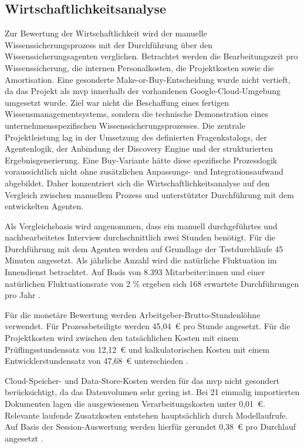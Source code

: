 \documentclass[
  10pt,
  ngerman,
  a4paper,
  toc=graduated,
  numbers=noenddot,
  headings=standardclasses,
  nonumberlist
]{scrartcl}
\begin{document}
\subsection{Wirtschaftlichkeitsanalyse}
\label{wirtschaftlichkeitsanalyse}
Zur Bewertung der Wirtschaftlichkeit wird der manuelle Wissenssicherungsprozess mit der Durchführung über den Wissenssicherungsagenten verglichen. Betrachtet werden die Bearbeitungszeit pro Wissenssicherung, die internen Personalkosten, die Projektkosten sowie die Amortisation. Eine gesonderte Make-or-Buy-Entscheidung wurde nicht vertieft, da das Projekt als \gls{mvp} innerhalb der vorhandenen Google-Cloud-Umgebung umgesetzt wurde. Ziel war nicht die Beschaffung eines fertigen Wissensmanagementsystems, sondern die technische Demonstration eines unternehmensspezifischen Wissenssicherungsprozesses. Die zentrale Projektleistung lag in der Umsetzung des definierten Fragenkatalogs, der Agentenlogik, der Anbindung der Discovery Engine und der strukturierten Ergebnisgenerierung. Eine Buy-Variante hätte diese spezifische Prozesslogik voraussichtlich nicht ohne zusätzlichen Anpassungs- und Integrationsaufwand abgebildet. Daher konzentriert sich die Wirtschaftlichkeitsanalyse auf den Vergleich zwischen manuellem Prozess und unterstützter Durchführung mit dem entwickelten Agenten.

Als Vergleichsbasis wird angenommen, dass ein manuell durchgeführtes und nachbearbeitetes Interview durchschnittlich zwei Stunden benötigt. Für die Durchführung mit dem Agenten werden auf Grundlage der Testdurchläufe 45 Minuten angesetzt. Als jährliche Anzahl wird die natürliche Fluktuation im Innendienst betrachtet. Auf Basis von 8.393 Mitarbeiter:innen und einer natürlichen Fluktuationsrate von 2 \% ergeben sich 168 erwartete Durchführungen pro Jahr \cite{signal_iduna_allgemeine_versicherung_ag_geschaeftsbericht_2024, agv_sozialstatistische_daten_2024}.

Für die monetäre Bewertung werden Arbeitgeber-Brutto-Stundenlöhne verwendet. Für Prozessbeteiligte werden 45,04~\euro{} pro Stunde angesetzt. Für die Projektkosten wird zwischen den tatsächlichen Kosten mit einem Prüflingsstundensatz von 12,12~\euro{} und kalkulatorischen Kosten mit einem Entwicklerstundensatz von 47,68~\euro{} unterschieden \cite{bundesagentur_entgeltatlas_gehalt_fachinformatiker_2026,bundesagentur_entgeltatlas_versicherungen_finanzanlagen,signal_iduna_fachinformatiker_ausbildung_hamburg}.

Cloud-Speicher- und Data-Store-Kosten werden für das \gls{mvp} nicht gesondert berücksichtigt, da das Datenvolumen sehr gering ist. Bei 21 einmalig importierten Dokumenten lagen die ausgewiesenen Verarbeitungskosten unter 0,01~\euro{}. Relevante laufende Zusatzkosten entstehen hauptsächlich durch Modellaufrufe. Auf Basis der Session-Auswertung werden hierfür gerundet 0,38~\euro{} pro Durchlauf angesetzt \cite{google_gemini_api_pricing_2026}.
\end{document}
